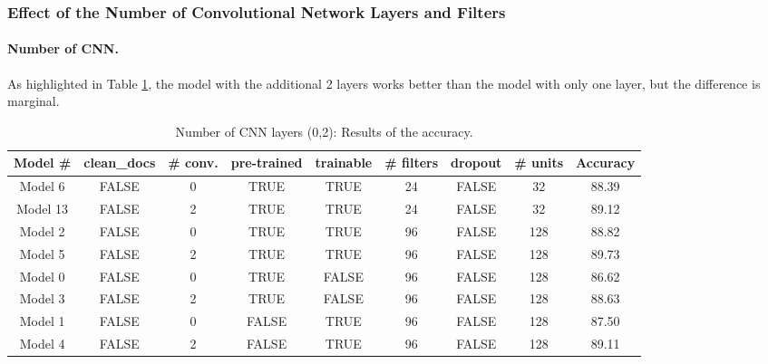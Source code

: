 \documentclass[11pt]{article}
\begin{document}
\subsubsection{Effect of the Number of Convolutional Network Layers and Filters}


\paragraph*{Number of CNN.} 
As highlighted in Table \ref{table:acc_numCNN}, the model with the additional 2 layers works better than the model with only one layer, but the difference is marginal. 
\begin{table}[h]
\centering
\begin{tabular}{||c|c|c|c|c|c|c|c|c||}
\hline
Model \# & clean\_docs &	\# conv.	& pre-trained &	trainable &	\# filters	& dropout &	\# units & Accuracy\\
\hline
Model	6	&	FALSE	&	\cellcolor{yellow!25}0	&	TRUE	&	TRUE	&	24	&	FALSE	&	32	&	88.39	\\
\hline
Model	13	&	FALSE	&	\cellcolor{blue!25}2	&	TRUE	&	TRUE	&	24	&	FALSE	&	32	&	\cellcolor{blue!25}89.12	\\
\hline
\hline
Model 2	&	FALSE	&	\cellcolor{yellow!25}0	&	TRUE	&	TRUE	&	96	&	FALSE	&	128	&	88.82\\
\hline
Model 5	&	FALSE	&	\cellcolor{blue!25}2	&	TRUE	&	TRUE	&	96	&	FALSE	&	128	&	\cellcolor{blue!25}89.73\\
\hline
\hline
Model 0   & FALSE	 & \cellcolor{yellow!25}0	&TRUE	&FALSE	&96	&FALSE	&128 & 86.62\\
\hline
Model 3	&	FALSE	&	\cellcolor{blue!25}2	&	TRUE	&	FALSE	&	96	&	FALSE	&	128	&	\cellcolor{blue!25}88.63\\
\hline
\hline
Model 1	&	FALSE	&	\cellcolor{yellow!25}0	&	FALSE	&	TRUE	&	96	&	FALSE	&	128	&	87.50\\
\hline
Model 4	&	FALSE	&	\cellcolor{blue!25}2	&	FALSE	&	TRUE	&	96	&	FALSE	&	128	&	\cellcolor{blue!25}89.11\\
\hline
\end{tabular}
\caption{Number of CNN layers (0,2): Results of the accuracy.}
\label{table:acc_numCNN}
\end{table}
\end{document}
